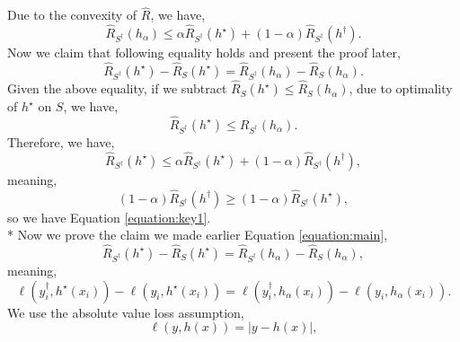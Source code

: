 \documentclass{article}
\begin{document}
Due to the convexity of $\hat{R}$, we have,
\begin{equation} 
\hat{R}_{S^{\dagger}}\left(h_{\alpha}\right) \leq  \alpha \hat{R}_{S^{\dagger}}\left(h^\star \right) + \left(1 - \alpha\right) \hat{R}_{S^{\dagger}}\left(h^{\dagger}\right).
\end{equation}
Now we claim that following equality holds and present the proof later,
\begin{equation} \label{equation:main} 
\hat{R}_{S^{\dagger}}\left(h^\star \right) - \hat{R}_{S}\left(h^\star \right) = \hat{R}_{S^{\dagger}}\left(h_{\alpha}\right) - \hat{R}_{S}\left(h_{\alpha}\right).
\end{equation}
Given the above equality, if we subtract $\hat{R}_{S}\left(h^\star \right) \leq  \hat{R}_{S}\left(h_{\alpha}\right)$, due to optimality of $h^\star $ on $S $, we have,
\begin{equation} 
\hat{R}_{S^{\dagger}}\left(h^\star \right) \leq  \hat{R}_{S^{\dagger}}\left(h_{\alpha}\right).
\end{equation}
Therefore, we have,
\begin{equation} 
\hat{R}_{S^{\dagger}}\left(h^\star \right) \leq  \alpha \hat{R}_{S^{\dagger}}\left(h^\star \right) + \left(1 - \alpha\right) \hat{R}_{S^{\dagger}}\left(h^{\dagger}\right),
\end{equation}
meaning,
\begin{equation} 
\left(1 - \alpha\right) \hat{R}_{S^{\dagger}}\left(h^{\dagger}\right) \geq  \left(1 - \alpha\right) \hat{R}_{S^{\dagger}}\left(h^\star \right),
\end{equation}
so we have Equation \ref{equation:key1}.
\\* Now we prove the claim we made earlier Equation \ref{equation:main},
\begin{equation} 
\hat{R}_{S^{\dagger}}\left(h^\star \right) - \hat{R}_{S}\left(h^\star \right) = \hat{R}_{S^{\dagger}}\left(h_{\alpha}\right) - \hat{R}_{S}\left(h_{\alpha}\right),
\end{equation}
meaning,
\begin{equation} 
\ell\left(y^{\dagger}_{i}, h^\star \left(x_{i}\right)\right) - \ell\left(y_{i}, h^\star \left(x_{i}\right)\right) = \ell\left(y^{\dagger}_{i}, h_{\alpha}\left(x_{i}\right)\right) - \ell\left(y_{i}, h_{\alpha}\left(x_{i}\right)\right).
\end{equation}
We use the absolute value loss assumption,
\begin{equation} 
\ell\left(y, h\left(x\right)\right) = \left| y - h\left(x\right) \right|,
\end{equation}
\end{document}
